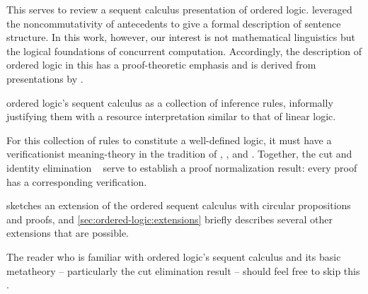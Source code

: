This 
serves to review a sequent calculus presentation of ordered logic.
%
%
%
%
% 
 leveraged the noncommutativity of antecedents to give a formal description of sentence structure.
In this work, however, our interest is not mathematical linguistics but the logical foundations of concurrent computation.
Accordingly, the description of ordered logic in this  has a proof-theoretic emphasis and is derived from presentations by \citeauthor{Polakow+Pfenning:MFPS99}\autocites{Polakow+Pfenning:MFPS99}{Pfenning:CMU16}.

 ordered logic's sequent calculus as a collection of inference rules, informally justifying them with a resource interpretation similar to that of linear logic.

For this collection of rules to constitute a well-defined logic, it must have a verificationist meaning-theory in the tradition of \citeauthor{Gentzen:MZ35}, \citeauthor{Dummett:WJ76}, and \citeauthor{Martin-Lof:Siena83}\autocites{Gentzen:MZ35}{Dummett:WJ76}{Martin-Lof:Siena83}.
Together, the cut and identity elimination ~ serve to establish a proof normalization result: every proof has a corresponding verification.

 sketches an extension of the ordered sequent calculus with circular propositions and proofs, and \cref{sec:ordered-logic:extensions} briefly describes several other extensions that are possible.

The reader who is familiar with ordered logic's sequent calculus and its basic metatheory -- particularly the cut elimination result -- should feel free to skip this .


